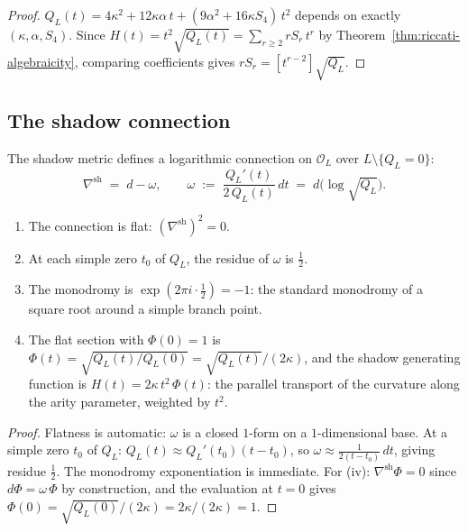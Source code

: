 \begin{proof}
$Q_L(t) = 4\kappa^2 + 12\kappa\alpha\,t + (9\alpha^2 + 16\kappa S_4)\,t^2$
depends on exactly $(\kappa, \alpha, S_4)$.
Since $H(t) = t^2\sqrt{Q_L(t)} = \sum_{r \geq 2} rS_r\,t^r$
by Theorem~\ref{thm:riccati-algebraicity}, comparing
coefficients gives $rS_r = [t^{r-2}]\sqrt{Q_L}$.
\end{proof}

\subsection{The shadow connection}

\begin{proposition}
\label{prop:shadow-connection}
The shadow metric defines a logarithmic connection on
$\mathcal{O}_L$ over $L \setminus \{Q_L = 0\}$:
\begin{equation}
\label{eq:shadow-connection}
 \nabla^{\mathrm{sh}} \;=\; d - \omega,
 \qquad
 \omega \;:=\; \frac{Q_L'(t)}{2\,Q_L(t)}\,dt
 \;=\; d\bigl(\log\sqrt{Q_L}\bigr).
\end{equation}
\begin{enumerate}[label=\textup{(\roman*)}]
\item The connection is flat: $(\nabla^{\mathrm{sh}})^2 = 0$.
\item At each simple zero $t_0$ of $Q_L$, the residue
 of $\omega$ is $\tfrac{1}{2}$.
\item The monodromy is $\exp(2\pi i \cdot \tfrac{1}{2}) = -1$:
 the standard monodromy of a square root around a simple
 branch point.
\item The flat section with $\Phi(0) = 1$ is
 $\Phi(t) = \sqrt{Q_L(t)/Q_L(0)} = \sqrt{Q_L(t)}/(2\kappa)$,
 and the shadow generating function is
 $H(t) = 2\kappa\,t^2\,\Phi(t)$: the parallel transport of
 the curvature along the arity parameter, weighted by $t^2$.
\end{enumerate}
\end{proposition}

\begin{proof}
Flatness is automatic: $\omega$ is a closed $1$-form on a
$1$-dimensional base. At a simple zero $t_0$ of $Q_L$:
$Q_L(t) \approx Q_L'(t_0)(t - t_0)$, so
$\omega \approx \frac{1}{2(t - t_0)}\,dt$,
giving residue $\tfrac{1}{2}$. The monodromy exponentiation
is immediate. For (iv): $\nabla^{\mathrm{sh}}\Phi = 0$
since $d\Phi = \omega\,\Phi$ by construction, and the
evaluation at $t = 0$ gives
$\Phi(0) = \sqrt{Q_L(0)}/(2\kappa) = 2\kappa/(2\kappa) = 1$.
\end{proof}

